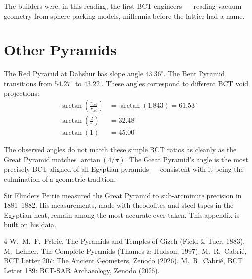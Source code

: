 \documentclass[aps,prl,twocolumn,superscriptaddress]{revtex4-2}
\begin{document}
The builders were, in this reading, the first BCT engineers --- reading vacuum geometry from sphere packing models, millennia before the lattice had a name.

\section{Other Pyramids}

The Red Pyramid at Dahshur has slope angle $43.36^\circ$. The Bent Pyramid transitions from $54.27^\circ$ to $43.22^\circ$. These angles correspond to different BCT void projections:
\begin{align}
\arctan\left(\frac{r_{\mathrm{oct}}}{r_{\mathrm{tet}}}\right) &= \arctan(1.843) = 61.53^\circ \\
\arctan\left(\frac{2}{\pi}\right) &= 32.48^\circ \\
\arctan(1) &= 45.00^\circ
\end{align}

The observed angles do not match these simple BCT ratios as cleanly as the Great Pyramid matches $\arctan(4/\pi)$. The Great Pyramid's angle is the most precisely BCT-aligned of all Egyptian pyramids --- consistent with it being the culmination of a geometric tradition.

\begin{acknowledgments}
Sir Flinders Petrie measured the Great Pyramid to sub-arcminute precision in 1881--1882. His measurements, made with theodolites and steel tapes in the Egyptian heat, remain among the most accurate ever taken. This appendix is built on his data.
\end{acknowledgments}

\begin{thebibliography}{4}
 W.~M.~F.~Petrie, The Pyramids and Temples of Gizeh (Field \& Tuer, 1883).
 M.~Lehner, The Complete Pyramids (Thames \& Hudson, 1997).
 M.~R.~Cabri\'e, BCT Letter 207: The Ancient Geometers, Zenodo (2026).
 M.~R.~Cabri\'e, BCT Letter 189: BCT-SAR Archaeology, Zenodo (2026).
\end{thebibliography}
\end{document}
